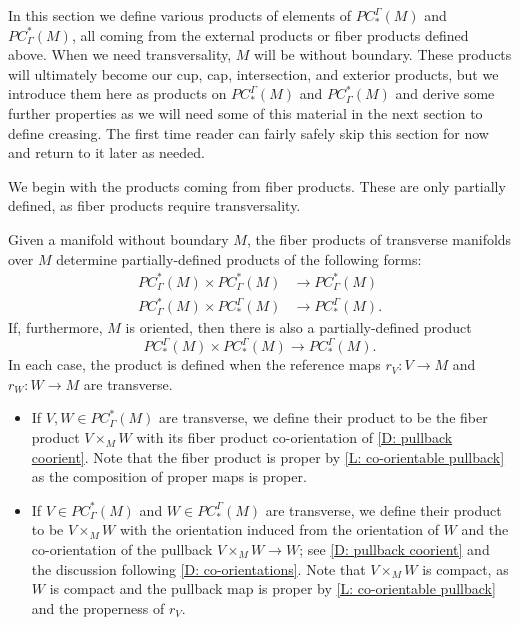 In this section we define various products of elements of $PC_*^\Gamma(M)$ and $PC^*_\Gamma(M)$, all coming from the external products or fiber products defined above.
When we need transversality, $M$ will be without boundary.
These products will ultimately become our cup, cap, intersection, and exterior products, but we introduce them here as products on $PC_*^\Gamma(M)$ and $PC^*_\Gamma(M)$ and derive some further properties as we will need some of this material in the next section to define creasing.
The first time reader can fairly safely skip this section for now and return to it later as needed.

We begin with the products coming from fiber products.
These are only partially defined, as fiber products require transversality.

\begin{definition}\label{D: PC products}
	Given a manifold without boundary $M$, the fiber products of transverse manifolds over $M$ determine partially-defined products of the following forms:
	\begin{align*}
		PC^*_\Gamma(M) \times PC^*_\Gamma(M)& \to PC^*_\Gamma(M)\\
		PC^*_\Gamma(M) \times PC_*^\Gamma(M)& \to PC_*^\Gamma(M).
	\end{align*}
	If, furthermore, $M$ is oriented, then there is also a partially-defined product
	$$PC_*^\Gamma(M) \times PC_*^\Gamma(M) \to PC_*^\Gamma(M).$$
	In each case, the product is defined when the reference maps $r_V \colon V \to M$ and $r_W \colon W \to M$ are transverse.

	\begin{itemize}
		\item If $V,W\in PC^*_\Gamma(M)$ are transverse, we define their product to be the fiber product $V \times_M W$ with its fiber product co-orientation of \cref{D: pullback coorient}.
		Note that the fiber product is proper by \cref{L: co-orientable pullback} as the composition of proper maps is proper.

		\item If $V \in PC^*_\Gamma(M)$ and $W \in PC_*^\Gamma(M)$ are transverse, we define their product to be $V \times_M W$ with the orientation induced from the orientation of $W$ and the co-orientation of the pullback $V \times_M W \to W$; see \cref{D: pullback coorient} and the discussion following \cref{D: co-orientations}.
		Note that $V \times_M W$ is compact, as $W$ is compact and the pullback map is proper by \cref{L: co-orientable pullback} and the properness of $r_V$.


\end{itemize}
\end{definition}

